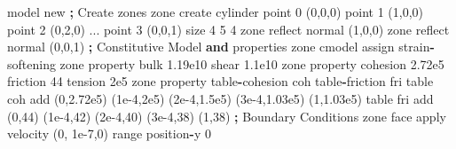 \documentclass[a4paper, nobind]{templates/ociamthesis}
\newenvironment{Shaded}{\begin{snugshade}}{\end{snugshade}}
\newcommand{\BuiltInTok}[1]{#1}
\newcommand{\DecValTok}[1]{\textcolor[rgb]{0.00,0.00,0.81}{#1}}
\newcommand{\FloatTok}[1]{\textcolor[rgb]{0.00,0.00,0.81}{#1}}
\newcommand{\KeywordTok}[1]{\textcolor[rgb]{0.13,0.29,0.53}{\textbf{#1}}}
\newcommand{\NormalTok}[1]{#1}
\newcommand{\OperatorTok}[1]{\textcolor[rgb]{0.81,0.36,0.00}{\textbf{#1}}}
\newcommand{\StringTok}[1]{\textcolor[rgb]{0.31,0.60,0.02}{#1}}
\renewenvironment{Shaded}
{
  \vspace{10pt}%
  \begin{snugshade}%
}{%
  \end{snugshade}%
  \vspace{8pt}%
}
\begin{document}
\begin{Shaded}
\begin{Highlighting}[]
\NormalTok{model new}
\OperatorTok{;}\NormalTok{ Create zones}
\NormalTok{zone create cylinder point }\DecValTok{0}\NormalTok{ (}\DecValTok{0}\NormalTok{,}\DecValTok{0}\NormalTok{,}\DecValTok{0}\NormalTok{) point }\DecValTok{1}\NormalTok{ (}\DecValTok{1}\NormalTok{,}\DecValTok{0}\NormalTok{,}\DecValTok{0}\NormalTok{) point }\DecValTok{2}\NormalTok{ (}\DecValTok{0}\NormalTok{,}\DecValTok{2}\NormalTok{,}\DecValTok{0}\NormalTok{) ...}
\NormalTok{point }\DecValTok{3}\NormalTok{ (}\DecValTok{0}\NormalTok{,}\DecValTok{0}\NormalTok{,}\DecValTok{1}\NormalTok{) size }\DecValTok{4} \DecValTok{5} \DecValTok{4}
\NormalTok{zone reflect normal (}\DecValTok{1}\NormalTok{,}\DecValTok{0}\NormalTok{,}\DecValTok{0}\NormalTok{)}
\NormalTok{zone reflect normal (}\DecValTok{0}\NormalTok{,}\DecValTok{0}\NormalTok{,}\DecValTok{1}\NormalTok{)}
\OperatorTok{;}\NormalTok{ Constitutive Model }\KeywordTok{and}\NormalTok{ properties}
\NormalTok{zone cmodel assign strain}\OperatorTok{{-}}\NormalTok{softening}
\NormalTok{zone }\BuiltInTok{property}\NormalTok{ bulk }\FloatTok{1.19e10}\NormalTok{ shear }\FloatTok{1.1e10}
\NormalTok{zone }\BuiltInTok{property}\NormalTok{ cohesion }\FloatTok{2.72e5}\NormalTok{ friction }\DecValTok{44}\NormalTok{ tension }\FloatTok{2e5}
\NormalTok{zone }\BuiltInTok{property}\NormalTok{ table}\OperatorTok{{-}}\NormalTok{cohesion }\StringTok{\textquotesingle{}coh\textquotesingle{}}\NormalTok{ table}\OperatorTok{{-}}\NormalTok{friction }\StringTok{\textquotesingle{}fri\textquotesingle{}}
\NormalTok{table }\StringTok{\textquotesingle{}coh\textquotesingle{}}\NormalTok{ add (}\DecValTok{0}\NormalTok{,}\FloatTok{2.72e5}\NormalTok{) (}\FloatTok{1e{-}4}\NormalTok{,}\FloatTok{2e5}\NormalTok{) (}\FloatTok{2e{-}4}\NormalTok{,}\FloatTok{1.5e5}\NormalTok{) (}\FloatTok{3e{-}4}\NormalTok{,}\FloatTok{1.03e5}\NormalTok{) (}\DecValTok{1}\NormalTok{,}\FloatTok{1.03e5}\NormalTok{)}
\NormalTok{table }\StringTok{\textquotesingle{}fri\textquotesingle{}}\NormalTok{ add (}\DecValTok{0}\NormalTok{,}\DecValTok{44}\NormalTok{) (}\FloatTok{1e{-}4}\NormalTok{,}\DecValTok{42}\NormalTok{) (}\FloatTok{2e{-}4}\NormalTok{,}\DecValTok{40}\NormalTok{) (}\FloatTok{3e{-}4}\NormalTok{,}\DecValTok{38}\NormalTok{) (}\DecValTok{1}\NormalTok{,}\DecValTok{38}\NormalTok{)}
\OperatorTok{;}\NormalTok{ Boundary Conditions}
\NormalTok{zone face }\BuiltInTok{apply}\NormalTok{ velocity (}\DecValTok{0}\NormalTok{, }\FloatTok{1e{-}7}\NormalTok{,}\DecValTok{0}\NormalTok{) }\BuiltInTok{range}\NormalTok{ position}\OperatorTok{{-}}\NormalTok{y }\DecValTok{0}

\end{Highlighting}
\end{Shaded}
\end{document}
